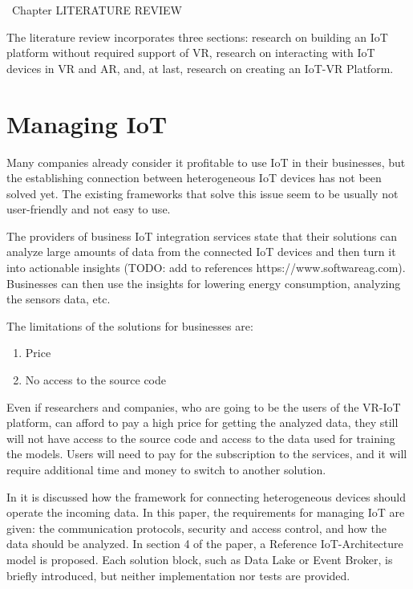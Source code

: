 
\ Chapter {LITERATURE REVIEW}


The literature review incorporates three sections: research on building an IoT platform without required support of VR, research on interacting with IoT devices in VR and AR, and, at last, research on creating an IoT-VR Platform.

\section{Managing IoT}

Many companies already consider it profitable to use IoT in their businesses, but the establishing connection between heterogeneous IoT devices has not been solved yet. The existing frameworks that solve this issue seem to be usually not user-friendly and not easy to use. 

The providers of business IoT integration services state that their solutions can analyze large amounts of data from the connected IoT devices and then turn it into actionable insights (TODO: add to references https://www.softwareag.com). Businesses can then use the insights for lowering energy consumption, analyzing the sensors data, etc.

The limitations of the solutions for businesses are:
\begin{enumerate}
    \item Price
    \item No access to the source code
\end{enumerate}

Even if researchers and companies, who are going to be the users of the VR-IoT platform, can afford to pay a high price for getting the analyzed data, they still will not have access to the source code and access to the data used for training the models. Users will need to pay for the subscription to the services, and it will require additional time and money to switch to another solution.

In \cite{k_mohapatra_solution_2016} it is discussed how the framework for connecting heterogeneous devices should operate the incoming data. In this paper, the requirements for managing IoT are given: the communication protocols, security and access control, and how the data should be analyzed. In section 4 of the paper, a Reference IoT-Architecture model is proposed. Each solution block, such as Data Lake or Event Broker, is briefly introduced, but neither implementation nor tests are provided.

